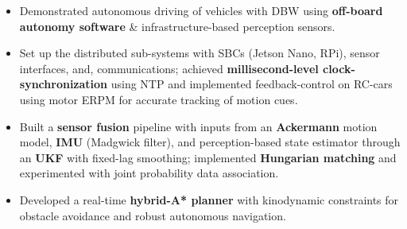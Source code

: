 {    \begin{itemize}
        \item Demonstrated autonomous driving of vehicles with DBW using \textbf{off-board autonomy software} \& infrastructure-based perception sensors.
        \item Set up the distributed sub-systems with SBCs (Jetson Nano, RPi), sensor interfaces, and, communications; achieved \textbf{millisecond-level clock-synchronization} using NTP and implemented feedback-control on RC-cars using motor ERPM for accurate tracking of motion cues.
        \item Built a \textbf{sensor fusion} pipeline with inputs from an \textbf{Ackermann} motion model, \textbf{IMU} (Madgwick filter), and perception-based state estimator through an \textbf{UKF} with fixed-lag smoothing; implemented \textbf{Hungarian matching} and experimented with joint probability data association. 
        \item Developed a real-time \textbf{hybrid-A* planner} with kinodynamic constraints for obstacle avoidance and robust autonomous navigation.
        \end{itemize}}
\divider





